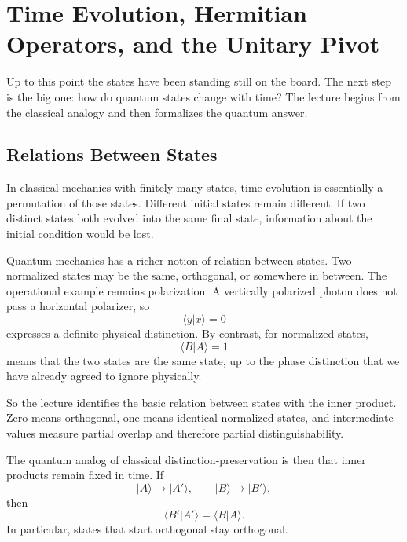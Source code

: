 \section{Time Evolution, Hermitian Operators, and the Unitary Pivot}

Up to this point the states have been standing still on the board. The next step is the big one: how do quantum states change with time? The lecture begins from the classical analogy and then formalizes the quantum answer.

\subsection{Relations Between States}

In classical mechanics with finitely many states, time evolution is essentially a permutation of those states. Different initial states remain different. If two distinct states both evolved into the same final state, information about the initial condition would be lost.

Quantum mechanics has a richer notion of relation between states. Two normalized states may be the same, orthogonal, or somewhere in between. The operational example remains polarization. A vertically polarized photon does not pass a horizontal polarizer, so
\begin{equation}
\langle y|x\rangle=0
\end{equation}
expresses a definite physical distinction. By contrast, for normalized states,
\begin{equation}
\langle B|A\rangle=1
\end{equation}
means that the two states are the same state, up to the phase distinction that we have already agreed to ignore physically.

So the lecture identifies the basic relation between states with the inner product. Zero means orthogonal, one means identical normalized states, and intermediate values measure partial overlap and therefore partial distinguishability.

The quantum analog of classical distinction-preservation is then that inner products remain fixed in time. If
\begin{equation}
|A\rangle\to |A'\rangle,
\qquad
|B\rangle\to |B'\rangle,
\end{equation}
then
\begin{equation}
\langle B'|A'\rangle=\langle B|A\rangle.
\end{equation}
In particular, states that start orthogonal stay orthogonal.

